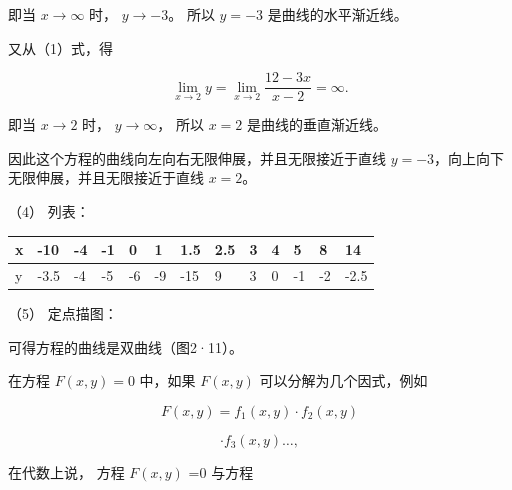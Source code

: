 即当 \(x \to \infty\) 时， \(y \to -3\)。 所以 \(y = -3\)
是曲线的水平渐近线。

又从（1）式，得

\[
\lim_{x \rightarrow 2} y = \lim_{x \rightarrow 2} \frac {12 - 3 x}{x - 2} = \infty.
\]

即当 \(x \to 2\) 时， \(y \to \infty\)， 所以 \(x = 2\)
是曲线的垂直渐近线。

因此这个方程的曲线向左向右无限伸展，并且无限接近于直线
\(y = -3\)，向上向下无限伸展，并且无限接近于直线 \(x = 2\)。

（4） 列表：

{\def\LTcaptype{none} %
\begin{longtable}[]{@{}lllllllllllll@{}}
\toprule\noalign{}
x & -10 & -4 & -1 & 0 & 1 & 1.5 & 2.5 & 3 & 4 & 5 & 8 & 14 \\
\midrule\noalign{}
\endhead
\bottomrule\noalign{}
\endlastfoot
y & -3.5 & -4 & -5 & -6 & -9 & -15 & 9 & 3 & 0 & -1 & -2 & -2.5 \\
\end{longtable}
}

（5） 定点描图：

可得方程的曲线是双曲线（图2·11）。

在方程 \(F(x, y) = 0\) 中，如果 \(F(x, y)\) 可以分解为几个因式，例如

\[
F (x, y) = f_{1} (x, y) \cdot f_{2} (x, y)
\]

\[
\cdot f_{3} (x, y) \dots,
\]

在代数上说， 方程 \(F(x, y)\) =0 与方程

